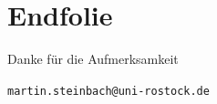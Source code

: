 \documentclass{beamer}
\begin{document}
\part{Endfolie}
\begin{frame}

\framebreak
\begin{center}
\Large \textcolor{red!60}{{Danke für die Aufmerksamkeit}}\\
\vspace{0.5 cm}
\end{center}
\begin{center}

\texttt{\scriptsize martin.steinbach@uni-rostock.de}\\

\end{center}



\end{frame}
\end{document}
